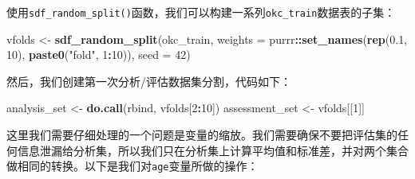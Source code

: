 \documentclass[
]{article}
\newenvironment{Shaded}{\begin{snugshade}}{\end{snugshade}}
\newcommand{\ControlFlowTok}[1]{\textcolor[rgb]{0.13,0.29,0.53}{\textbf{#1}}}
\newcommand{\DataTypeTok}[1]{\textcolor[rgb]{0.13,0.29,0.53}{#1}}
\newcommand{\DecValTok}[1]{\textcolor[rgb]{0.00,0.00,0.81}{#1}}
\newcommand{\FloatTok}[1]{\textcolor[rgb]{0.00,0.00,0.81}{#1}}
\newcommand{\KeywordTok}[1]{\textcolor[rgb]{0.13,0.29,0.53}{\textbf{#1}}}
\newcommand{\NormalTok}[1]{#1}
\newcommand{\OperatorTok}[1]{\textcolor[rgb]{0.81,0.36,0.00}{\textbf{#1}}}
\newcommand{\StringTok}[1]{\textcolor[rgb]{0.31,0.60,0.02}{#1}}
\begin{document}
使用\texttt{sdf\_random\_split()}函数，我们可以构建一系列\texttt{okc\_train}数据表的子集：

\begin{Shaded}
\begin{Highlighting}[]
\NormalTok{vfolds <-}\StringTok{ }\KeywordTok{sdf_random_split}\NormalTok{(okc_train, }\DataTypeTok{weights =}\NormalTok{ purrr}\OperatorTok{::}\KeywordTok{set_names}\NormalTok{(}\KeywordTok{rep}\NormalTok{(}\FloatTok{0.1}\NormalTok{, }\DecValTok{10}\NormalTok{), }\KeywordTok{paste0}\NormalTok{(}\StringTok{"fold"}\NormalTok{, }
    \DecValTok{1}\OperatorTok{:}\DecValTok{10}\NormalTok{)), }\DataTypeTok{seed =} \DecValTok{42}\NormalTok{)}
\end{Highlighting}
\end{Shaded}

然后，我们创建第一次分析/评估数据集分割，代码如下：

\begin{Shaded}
\begin{Highlighting}[]
\NormalTok{analysis_set <-}\StringTok{ }\KeywordTok{do.call}\NormalTok{(rbind, vfolds[}\DecValTok{2}\OperatorTok{:}\DecValTok{10}\NormalTok{])}
\NormalTok{assessment_set <-}\StringTok{ }\NormalTok{vfolds[[}\DecValTok{1}\NormalTok{]]}
\end{Highlighting}
\end{Shaded}

这里我们需要仔细处理的一个问题是变量的缩放。我们需要确保不要把评估集的任何信息泄漏给分析集，所以我们只在分析集上计算平均值和标准差，并对两个集合做相同的转换。以下是我们对\texttt{age}变量所做的操作：

\begin{Shaded}
\end{Shaded}
\end{document}
